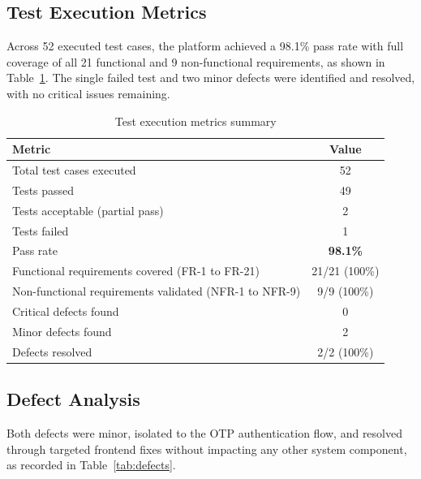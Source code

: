 \subsection{Test Execution Metrics}
Across 52 executed test cases, the platform achieved a 98.1\% pass rate with full coverage of all 21 functional and 9 non-functional requirements, as shown in Table~\ref{tab:exec_metrics}. The single failed test and two minor defects were identified and resolved, with no critical issues remaining.
\begin{table}[H]
\caption{Test execution metrics summary}
\centering
\renewcommand{\arraystretch}{1.4}
\begin{tabular}{|l|c|}
\hline
\rowcolor{cyan!20}
\textbf{Metric} & \textbf{Value} \\
\hline
Total test cases executed & 52 \\
\hline
Tests passed & 49 \\
\hline
Tests acceptable (partial pass) & 2 \\
\hline
Tests failed & 1 \\
\hline
Pass rate & \textbf{98.1\%} \\
\hline
Functional requirements covered (FR-1 to FR-21) & 21/21 (100\%) \\
\hline
Non-functional requirements validated (NFR-1 to NFR-9) & 9/9 (100\%) \\
\hline
Critical defects found & 0 \\
\hline
Minor defects found & 2 \\
\hline
Defects resolved & 2/2 (100\%) \\
\hline
\end{tabular}
\label{tab:exec_metrics}
\end{table}
\newpage
\subsection{Defect Analysis}
Both defects were minor, isolated to the OTP authentication flow, and resolved through targeted frontend fixes without impacting any other system component, as recorded in Table~\ref{tab:defects}.

\begin{table}[H]
\caption{Defect tracking log}
\centering
\renewcommand{\arraystretch}{1.3}
\label{tab:defects}
\end{table}

